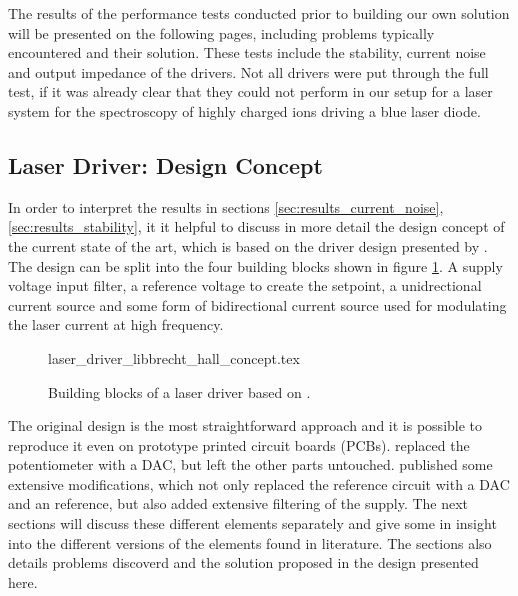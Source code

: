 The results of the performance tests conducted prior to building our own solution will be presented on the following pages, including problems typically encountered and their solution. These tests include the stability, current noise and output impedance of the drivers. Not all drivers were put through the full test, if it was already clear that they could not perform in our setup for a laser system for the spectroscopy of highly charged ions driving a blue laser diode.

\clearpage
\subsection{Laser Driver: Design Concept}
In order to interpret the results in sections \ref{sec:results_current_noise}, \ref{sec:results_stability}, it it helpful to discuss in more detail the design concept of the current state of the art, which is based on the driver design presented by \citeauthor{libbrecht_hall} \cite{libbrecht_hall}. The design can be split into the four building blocks shown in figure \ref{fig:laser_driver_libbrecht_hall_concept}. A supply voltage input filter, a reference voltage to create the setpoint, a unidrectional current source and some form of bidirectional current source used for modulating the laser current at high frequency.

\begin{figure}[ht]
    \centering
        {laser_driver_libbrecht_hall_concept.tex}
    \caption{Building blocks of a laser driver based on \cite{libbrecht_hall}.}
    \label{fig:laser_driver_libbrecht_hall_concept}
\end{figure}

The original design is the most straightforward approach and it is possible to reproduce it even on prototype printed circuit boards (PCBs). \citeauthor{laser_driver_digital} \cite{laser_driver_digital} replaced the potentiometer with a DAC, but left the other parts untouched. \citeauthor{laser_driver_qcl_taubman} \cite{laser_driver_qcl_taubman,laser_driver_qcl_taubman_multiplexer} published some extensive modifications, which not only replaced the reference circuit with a DAC and an  reference, but also added extensive filtering of the supply. The next sections will discuss these different elements separately and give some in insight into the different versions of the elements found in literature. The sections also details problems discoverd and the solution proposed in the design presented here.

